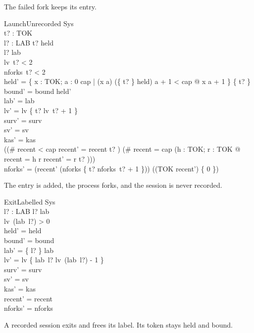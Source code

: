 \documentclass[a4paper,10pt,fleqn]{article}
\begin{document}
The failed fork keeps its entry.

\begin{schema}{LaunchUnrecorded}
  \Delta Sys \\
  t? : TOK \\ l? : LAB
\where
  t? \notin \dom held \\
  l? \notin \dom lab \\
  lv~t? < 2 \\
  nforks~t? < 2 \\
  held' = \{ x : TOK; a : 0 \upto cap | (x \mapsto a) \in (\{ t? \} \ndres held) \land a + 1 < cap @ x \mapsto a + 1 \} \cup \{ t?  \} \\
  bound' = bound \cap \dom held' \\
  lab' = lab \\
  lv' = lv \oplus \{ t? \mapsto lv~t? + 1 \} \\
  surv' = surv \\
  sv' = sv \\
  kas' = kas \\
  ((\# recent < cap \land recent' = recent \cat \langle t? \rangle) \lor (\# recent = cap \land (\exists h : TOK; r : \seq TOK @ recent = \langle h \rangle \cat r \land recent' = r \cat \langle t? \rangle))) \\
  nforks' = (\ran recent' \dres (nforks \oplus \{ t? \mapsto nforks~t? + 1 \})) \cup ((TOK \setminus \ran recent') \cross \{ 0 \})
\end{schema}

The entry is added, the process forks, and the session is never recorded.

\begin{schema}{ExitLabelled}
  \Delta Sys \\
  l? : LAB
\where
  l? \in \dom lab \\
  lv~(lab~l?) > 0 \\
  held' = held \\
  bound' = bound \\
  lab' = \{ l? \} \ndres lab \\
  lv' = lv \oplus \{ lab~l? \mapsto lv~(lab~l?) - 1 \} \\
  surv' = surv \\
  sv' = sv \\
  kas' = kas \\
  recent' = recent \\
  nforks' = nforks
\end{schema}

A recorded session exits and frees its label. Its token stays held and bound.
\end{document}
